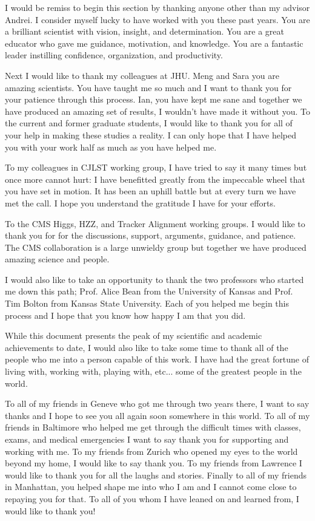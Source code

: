 \begin{frontmatter}
\begin{acknowledgement}
I would be remiss to begin this section by thanking anyone other than my advisor Andrei. I consider myself lucky to have worked with you these past years. You are a brilliant scientist with vision, insight, and determination. You are a great educator who gave me guidance, motivation, and knowledge. You are a fantastic leader instilling confidence, organization, and productivity.

Next I would like to thank my colleagues at JHU. Meng and Sara you are amazing scientists. You have taught me so much and I want to thank you for your patience through this process. Ian, you have kept me sane and together we have produced an amazing set of results, I wouldn't have made it without you. To the current and former graduate students, I would like to thank you for all of your help in making these studies a reality. I can only hope that I have helped you with your work half as much as you have helped me.

To my colleagues in CJLST working group, I have tried to say it many times but once more cannot hurt: I have benefitted greatly from the impeccable wheel that you have set in motion. It has been an uphill battle but at every turn we have met the call. I hope you understand the gratitude I have for your efforts.

To the CMS Higgs, HZZ, and Tracker Alignment working groups. I would like to thank you for for the discussions, support, arguments, guidance, and patience. The CMS collaboration is a large unwieldy group but together we have  produced amazing science and people.

I would also like to take an opportunity to thank the two professors who started me down this path; Prof. Alice Bean from the University of Kansas and Prof. Tim Bolton from Kansas State University. Each of you helped me begin this process and I hope that you know how happy I am that you did.

While this document presents the peak of my scientific and academic achievements to date, I would also like to take some time to thank all of the people who me into a person capable of this work. I have had the great fortune of living with, working with, playing with, etc... some of the greatest people in the world. 

To all of my friends in Geneve who got me through two years there, I want to say thanks and I hope to see you all again soon somewhere in this world. To all of my friends in Baltimore who helped me get through the difficult times with classes, exams, and medical emergencies I want to say thank you for supporting and working with me. To my friends from Zurich who opened my eyes to the world beyond my home, I would like to say thank you. To my friends from Lawrence I would like to thank you for all the laughs and stories. Finally to all of my friends in Manhattan, you helped shape me into who I am and I cannot come close to repaying you for that. To all of you whom I have leaned on and learned from, I would like to thank you!


\end{acknowledgement}
\end{frontmatter}
